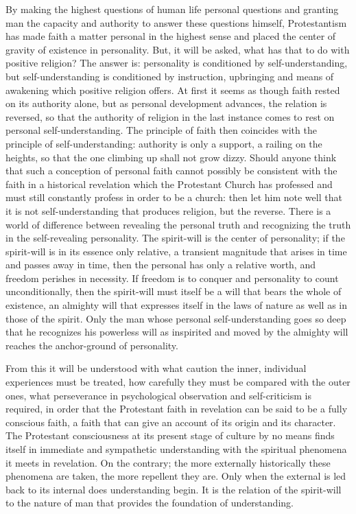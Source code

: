 \documentclass[12pt,a4paper,openany]{book}
\newcommand{\opage}[1]{\marginnote{\footnotesize\textit{[#1]}}}
\begin{document}
By making the highest questions of human life
personal questions and granting man the capacity
and authority to answer these questions himself,
Protestantism has made faith a matter personal in the highest sense
and placed the center of gravity of existence in
personality. But, it will be asked, what has that
to do with positive religion? The answer is: personality
is conditioned by self-understanding, but self-understanding
is conditioned by instruction, upbringing and
means of awakening which positive religion offers.
At first it seems as though faith rested on its authority
alone, but as personal development advances,
the relation is reversed, so that the authority of religion
in the last instance comes to rest
on personal self-understanding. The principle of faith
then coincides with the principle of self-understanding:
\setcounter{footnote}{0}%
\opage{68}authority is only a support, a railing on the heights, so that
the one climbing up shall not grow dizzy. Should anyone think
that such a conception of personal faith cannot possibly
be consistent with the faith in a historical revelation
which the Protestant Church has professed and
must still constantly profess in order to be a church:
then let him note well that it is not self-understanding
that produces religion, but the reverse.
There is a world of difference between revealing
the personal truth and recognizing the truth in
the self-revealing personality. The spirit-will is
the center of personality; if the spirit-will is in its essence
only relative, a transient magnitude that arises in
time and passes away in time, then the personal has only
a relative worth, and freedom perishes in necessity.
If freedom is to conquer and personality to count
unconditionally, then the spirit-will must itself be a will that
bears the whole of existence, an almighty will that expresses
itself in the laws of nature as well as in those of the spirit.
Only the man whose personal self-understanding goes
so deep that he recognizes his powerless will as inspirited
and moved by the almighty will reaches the anchor-ground
of personality.

From this it will be understood with what caution the
inner, individual experiences must be treated, how carefully
they must be compared with the outer ones, what
perseverance in psychological observation and self-criticism
is required, in order that the Protestant faith in revelation
can be said to be a fully conscious faith, a faith
that can give an account of its origin and its character.
The Protestant consciousness at its present stage of culture
by no means finds itself in immediate and sympathetic
\setcounter{footnote}{0}%
\opage{69}understanding with the spiritual phenomena it meets in
revelation. On the contrary; the more externally historically
these phenomena are taken, the more repellent they are.
Only when the external is led back to its internal
does understanding begin. It is the relation of the spirit-will
to the nature of man that provides the foundation of understanding.
\end{document}
